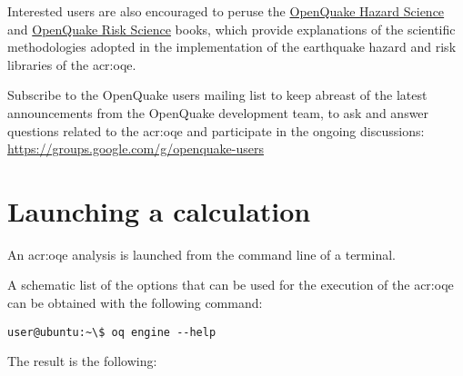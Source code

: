 Interested users are also encouraged to peruse the \href{https://storage.globalquakemodel.org/media/cms_page_media/432/oqhbt_BkpnqP8.pdf}{OpenQuake Hazard Science} and \href{https://storage.globalquakemodel.org/media/cms_page_media/432/oq-risk-manual-1_0.pdf}{OpenQuake Risk Science} books, which 
provide explanations of the scientific methodologies adopted in the implementation
of the earthquake hazard and risk libraries of the \glsdesc{acr:oqe}.

Subscribe to the OpenQuake users mailing list to keep abreast of the latest 
announcements from the OpenQuake development team, to ask and answer questions
related to the \glsdesc{acr:oqe} and participate in the ongoing discussions: 
\href{https://groups.google.com/g/openquake-users}{https://groups.google.com/g/openquake-users}



\section{Launching a calculation}

An \gls{acr:oqe} analysis is launched from the command line of a terminal.

A schematic list of the options that can be used for the execution of the
\gls{acr:oqe} can be obtained with the following command:

\begin{verbatim}
user@ubuntu:~\$ oq engine --help
\end{verbatim}

The result is the following:
\inputminted[firstline=1,fontsize=\footnotesize,frame=single]{shell-session}{oqum/help.txt}
